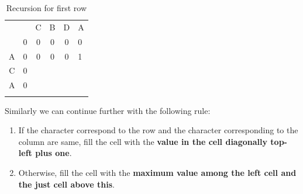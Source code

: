 \documentclass[a4paper,11pt]{book}
\begin{document}
\begin{table}[ht]
\centering
\begin{tabular}{cccccl}
                       &                        & C                      & B                      & D                      & A                      \\ \cline{2-6} 
\multicolumn{1}{c|}{}  & \multicolumn{1}{c|}{0} & \multicolumn{1}{c|}{0} & \multicolumn{1}{c|}{0} & \multicolumn{1}{c|}{0} & \multicolumn{1}{l|}{0} \\ \cline{2-6} 
\multicolumn{1}{c|}{A} & \multicolumn{1}{c|}{0} & \multicolumn{1}{c|}{0} & \multicolumn{1}{c|}{0} & \multicolumn{1}{c|}{0} & \multicolumn{1}{l|}{1} \\ \cline{2-6} 
\multicolumn{1}{c|}{C} & \multicolumn{1}{c|}{0} & \multicolumn{1}{c|}{}  & \multicolumn{1}{c|}{}  & \multicolumn{1}{c|}{}  & \multicolumn{1}{l|}{}  \\ \cline{2-6} 
\multicolumn{1}{c|}{A} & \multicolumn{1}{c|}{0} & \multicolumn{1}{c|}{}  & \multicolumn{1}{c|}{}  & \multicolumn{1}{c|}{}  & \multicolumn{1}{l|}{}  \\ \cline{2-6} 
\multicolumn{1}{l}{}   & \multicolumn{1}{l}{}   & \multicolumn{1}{l}{}   & \multicolumn{1}{l}{}   & \multicolumn{1}{l}{}   &                       
\end{tabular}
\caption*{Recursion for first row}
\end{table}

\noindent Similarly we can continue further with the following rule:
\begin{enumerate}
    \item If the character correspond to the row and the character corresponding to the column are same, fill the cell with the \textbf{value in the cell diagonally top-left plus one}. 
    \item Otherwise, fill the cell with the \textbf{maximum value among the left cell and the just cell above this}.
\end{enumerate}
\end{document}
